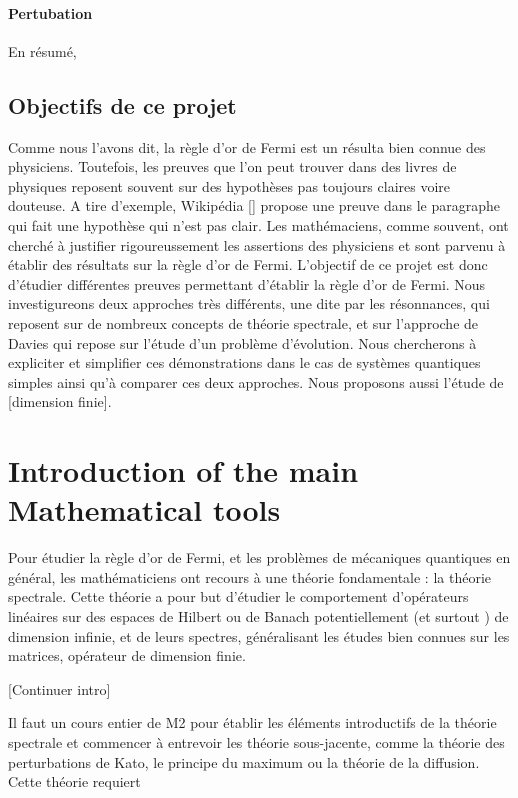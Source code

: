 \documentclass[12pt,openany,a4paper, titlepage]{article}
\theoremstyle{definition}
\theoremstyle{definition}
\theoremstyle{definition}
\theoremstyle{definition}
\theoremstyle{definition}
\begin{document}
\paragraph{Pertubation}


En résumé, 

\subsection{Objectifs de ce projet}

Comme nous l'avons dit, la règle d'or de Fermi est un résulta bien connue des physiciens. Toutefois, les preuves que l'on peut trouver dans des livres de physiques reposent souvent sur des hypothèses pas toujours claires voire douteuse. A tire d'exemple, Wikipédia [] propose une preuve dans le paragraphe qui fait une hypothèse qui n'est pas clair. Les mathémaciens, comme souvent, ont cherché à justifier rigoureussement les assertions des physiciens et sont parvenu à établir des résultats sur la règle d'or de Fermi. L'objectif de ce projet est donc d'étudier différentes preuves permettant d'établir la règle d'or de Fermi. Nous investigureons deux approches très différents, une dite par les résonnances, qui reposent sur de nombreux concepts de théorie spectrale, et sur l'approche de Davies qui repose sur l'étude d'un problème d'évolution. Nous chercherons à expliciter et simplifier ces démonstrations  dans le cas de systèmes quantiques simples ainsi qu'à comparer ces deux approches. Nous proposons aussi l'étude de [dimension finie]. 

\section{Introduction of the main Mathematical tools}

Pour étudier la règle d'or de Fermi, et les problèmes de mécaniques quantiques en général, les mathématiciens ont recours à une théorie fondamentale : la théorie spectrale. Cette théorie a pour but d'étudier le comportement d'opérateurs linéaires sur des espaces de Hilbert ou de Banach potentiellement (et surtout ) de dimension infinie, et de leurs spectres, généralisant les études bien connues sur les matrices, opérateur de dimension finie. 

[Continuer intro]

Il faut un cours entier de M2 pour établir les éléments introductifs de la théorie spectrale et commencer à entrevoir les théorie sous-jacente, comme la théorie des perturbations de Kato, le principe du maximum ou la théorie de la diffusion. Cette théorie requiert 
\end{document}
